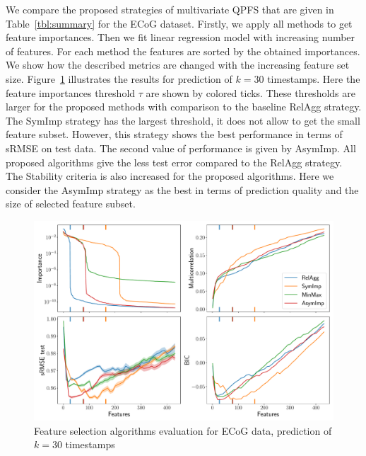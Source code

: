 \documentclass[12pt,twoside]{article}
\theoremstyle{definition}
\begin{document}
We compare the proposed strategies of multivariate QPFS that are given in Table~\ref{tbl:summary} for the ECoG dataset. 
Firstly, we apply all methods to get feature importances. 
Then we fit linear regression model with increasing number of features. 
For each method the features are sorted by the obtained importances. 
We show how the described metrics are changed with the increasing feature set size. 
Figure~\ref{fig:ecog_3_30_metrics} illustrates the results for prediction of $k = 30$ timestamps. 
Here the feature importances threshold $\tau$ are shown by colored ticks. 
These thresholds are larger for the proposed methods with comparison to the baseline RelAgg strategy. 
The SymImp strategy has the largest threshold, it does not allow to get the small feature subset.
However, this strategy shows the best performance in terms of sRMSE on test data.
The second value of performance is given by AsymImp.
All proposed algorithms give the less test error compared to the RelAgg strategy. 
The Stability criteria is also increased for the proposed algorithms.
Here we consider the AsymImp strategy as the best in terms of prediction quality and the size of selected feature subset.

\begin{figure}[h]
	\includegraphics[width=\linewidth]{figs/ecog_3_30_metrics.pdf}
	\caption{Feature selection algorithms evaluation for ECoG data, prediction of $k = 30$ timestamps}
	\label{fig:ecog_3_30_metrics}
\end{figure}
\end{document}
